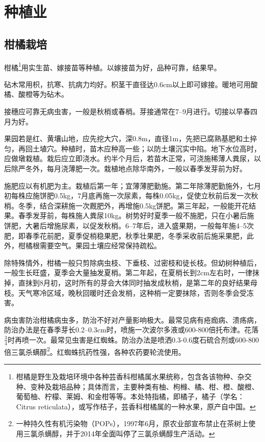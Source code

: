 \documentclass{ctexbook}
\begin{document}
\section{种植业}
\subsection{柑橘栽培}
柑橘\footnote{柑橘是野生及栽培环境中各种芸香科柑橘属水果统称，包含各该物种、杂交种、变种及栽培品种；具体而言，主要种类有柚、枸橼、橘、柑、橙、酸橙、葡萄柚、柠檬、莱姆、和金柑等等。本处特指橘，即橘子，橘子（学名：Citrus reticulata），或写作桔子，芸香科柑橘属的一种水果，原产自中国。}用实生苗、嫁接苗等种植。以嫁接苗为好，品种可靠，结果早。

砧木常用枳，抗寒、抗病力均好。枳茎干直径达0.6cm以上即可嫁接。暖地可用酸橘、酸橙等为砧木。

接穗应可靠无病虫害，一般是秋梢或春梢。芽接通常在7--9月进行。切接以早春四月为好。

果园若是红、黄壤山地，应先挖大穴，深0.8m，直径1m，先把已腐熟基肥和土捽匀，再回土埴穴。种植时，苗木应种高一些；以防土壤沉实中陷。地下水位高时，应做墩栽植。栽后应立即浇水。约半个月后，若苗木正常，可浇施稀薄人粪尿，以后除严冬外，每月浇薄肥一次。栽植地点除华南外，一般以春季发芽前为好。

施肥应以有机肥为主。栽植后第一年；宜薄薄肥勤施。第二年除薄肥勤施外，七月初每株应施饼肥0.5kg，7月底再施一次尿素，每株0.05kg，促使立秋前后发一次秋梢。冬季，结合深耕施一次厩肥外，再增施0.5kg饼肥。第三年起，一般能开花结果。春季发芽前，每株施人粪尿10kg。树势好时夏季一般不施肥，只在小暑后施饼肥，大暑后增施尿素，以促发秋梢。6--7年后，进入盛果期，一般每年施4--5次肥，即春季花前肥，夏季促梢稳果肥，秋季壮果肥，冬季采收前后施采果肥，此外，柑橘根需要空气。果园土壤应经常保持疏松。

除特殊情外，柑橘一般只剪除病虫枝、下垂枝、过密枝和徒长枝。但幼树种植后，一般生长旺盛，夏季会大量抽发夏梢。第二年起，在夏梢长到2cm左右时，一律抹掉，直抹到8月初，这时所有的芽会大体同时抽发成秋梢，是第二年的良好结果母枝。天气寒冷区域，晚秋回暖时还会发梢，这种梢一定要抹除，否则冬季会受冻害。

病虫害防治柑橘病虫多，防治不好对产量影响极大。最常见病有疮痂病、溃疡病，防治办法是在春季芽长0.2--0.3cm时，喷施一次波尔多液或600-800倍托布津。花落$\frac{3}{4}$时再喷一次。最常见虫害是红蜘蛛。防治办法是喷洒0.3-0.6度石硫合剂或600-800倍三氯杀螨醇\footnote{一种持久性有机污染物（POPs），1997年6月，原农业部宣布禁止在茶树上使用三氯杀螨醇，并于2014年全面叫停了三氯杀螨醇生产活动。}。红蜘蛛抗药性强，各种农药要轮流使用。
\end{document}
